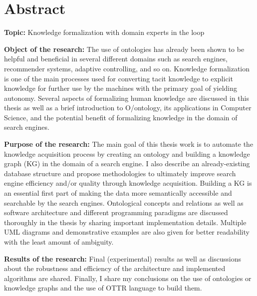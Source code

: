 \documentclass[14pt]{extreport}
\begin{document}

\chapter*{Abstract}
\textbf{Topic: } Knowledge formalization with domain experts in the loop

\indent
\textbf{Object of the research: }
The use of ontologies has already been shown to be helpful and beneficial in several different domains 
such as search engines, recommender systems, adaptive controlling, and so on. Knowledge formalization 
is one of the main processes used for converting tacit knowledge to explicit knowledge for further 
use by the machines with the primary goal of yielding autonomy.
Several aspects of formalizing human knowledge are discussed in this thesis as well as a 
brief introduction to O/ontology, its applications in Computer Science, and the potential benefit of 
formalizing knowledge in the domain of search engines. 

\textbf{Purpose of the research: }
The main goal of this thesis work is to automate 
the knowledge acquisition process by creating an ontology and building a knowledge graph (KG) 
in the domain of a search engine. I also describe an already-existing database structure and propose 
methodologies to ultimately improve search engine efficiency and/or quality through knowledge 
acquisition. Building a KG is an essential first part of making 
the data more semantically accessible and searchable by the search engines.  
Ontological concepts and relations as well as software architecture and 
different programming paradigms are discussed thoroughly in the thesis by sharing important 
implementation details. Multiple UML diagrams 
and demonstrative examples are also given for better readability with the least amount of 
ambiguity. 

\textbf{Results of the research: }
Final (experimental) results as well as discussions about the 
robustness and efficiency of the architecture and implemented algorithms are shared. Finally, 
I share my conclusions on the use of ontologies or knowledge graphs and the use of OTTR 
language to build them.
 
% 
% 
% 
\end{document}
